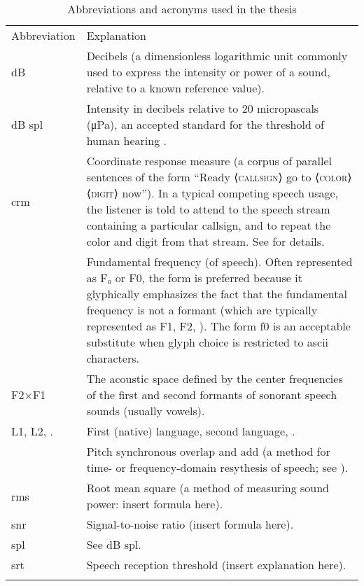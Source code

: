 \begin{table}
	\caption[Abbreviations and acronyms]{Abbreviations and acronyms used in the thesis \label{tab:Abbr}}
	\centering
	\begin{tabu} to \textwidth [c]{X[c m] X[5 m]}
		\toprule
		\everyrow{\midrule}
		\rowfont[c]{\bfseries} Abbreviation & Explanation\\
		{dB} & Decibels (a dimensionless logarithmic unit commonly used to express the intensity or power of a sound, relative to a known reference value).\\ 
		{dB \ac{spl}} & Intensity in decibels relative to 20 micropascals (μPa), an accepted standard for the threshold of human hearing .\\
		\ac{crm} & Coordinate response measure (a corpus of parallel sentences of the form “Ready ⟨\textsc{callsign}⟩ go to ⟨\textsc{color}⟩ ⟨\textsc{digit}⟩ now”).  In a typical competing speech usage, the listener is told to attend to the speech stream containing a particular callsign, and to repeat the color and digit from that stream.  See \citet{BoliaEtAl2000} for details.\\
		\fo & Fundamental frequency (of speech).  Often represented as F₀ or F0, the form \fo{} is preferred because it glyphically emphasizes the fact that the fundamental frequency is not a formant (which are typically represented as F1, F2, \etc).  The form f0 is an acceptable substitute when glyph choice is restricted to \ac{ascii} characters.\\
		F2×F1 & The acoustic space defined by the center frequencies of the first and second formants of sonorant speech sounds (usually vowels).\\
		L1, L2, \etc. & First (native) language, second language, \etc.\\
		\psola & Pitch synchronous overlap and add (a method for time- or frequency-domain resythesis of speech; see \citealt{CharpentierMoulines1988, MoulinesCharpentier1990}).\\
		\ac{rms} & Root mean square (a method of measuring sound power: insert formula here).\\
		\ac{snr} & Signal-to-noise ratio (insert formula here).\\
		\ac{spl} & See {dB \ac{spl}}.\\
		\everyrow{}
		\ac{srt} & Speech reception threshold (insert explanation here).\\
		\bottomrule
	\end{tabu}
\end{table}
